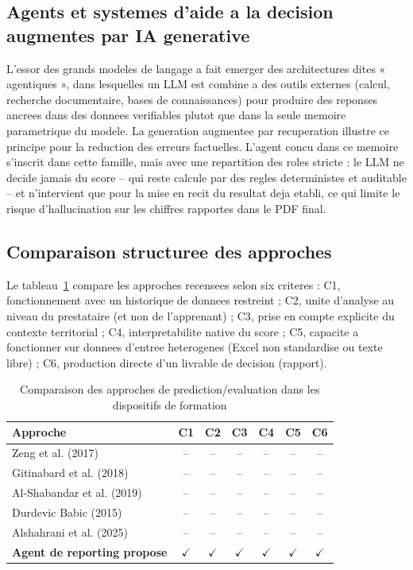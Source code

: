 \documentclass[12pt,a4paper,twoside,openany]{report}
\begin{document}
\subsection{Agents et systemes d'aide a la decision augmentes par IA generative}

L'essor des grands modeles de langage a fait emerger des architectures dites « agentiques », dans lesquelles un LLM est combine a des outils externes (calcul, recherche documentaire, bases de connaissances) pour produire des reponses ancrees dans des donnees verifiables plutot que dans la seule memoire parametrique du modele. La generation augmentee par recuperation illustre ce principe pour la reduction des erreurs factuelles. L'agent concu dans ce memoire s'inscrit dans cette famille, mais avec une repartition des roles stricte : le LLM ne decide jamais du score -- qui reste calcule par des regles deterministes et auditable -- et n'intervient que pour la mise en recit du resultat deja etabli, ce qui limite le risque d'hallucination sur les chiffres rapportes dans le PDF final.

\subsection{Comparaison structuree des approches}

Le tableau~\ref{tab:comparaison_lit} compare les approches recensees selon six criteres : C1, fonctionnement avec un historique de donnees restreint ; C2, unite d'analyse au niveau du prestataire (et non de l'apprenant) ; C3, prise en compte explicite du contexte territorial ; C4, interpretabilite native du score ; C5, capacite a fonctionner sur donnees d'entree heterogenes (Excel non standardise ou texte libre) ; C6, production directe d'un livrable de decision (rapport).

\begin{table}[H]
\centering
\caption{Comparaison des approches de prediction/evaluation dans les dispositifs de formation}
\label{tab:comparaison_lit}
\begin{tabular}{l cccccc}
\toprule
\textbf{Approche} & \textbf{C1} & \textbf{C2} & \textbf{C3} & \textbf{C4} & \textbf{C5} & \textbf{C6} \\
\midrule
Zeng et al. (2017) & -- & -- & -- & -- & -- & -- \\
Gitinabard et al. (2018) & -- & -- & -- & -- & -- & -- \\
Al-Shabandar et al. (2019) & -- & -- & -- & -- & -- & -- \\
Durdevic Babic (2015) & -- & -- & -- & -- & -- & -- \\
Alshahrani et al. (2025) & -- & -- & -- & -- & -- & -- \\
\midrule
\textbf{Agent de reporting propose} & $\checkmark$ & $\checkmark$ & $\checkmark$ & $\checkmark$ & $\checkmark$ & $\checkmark$ \\
\bottomrule
\end{tabular}
\end{table}
\end{document}
